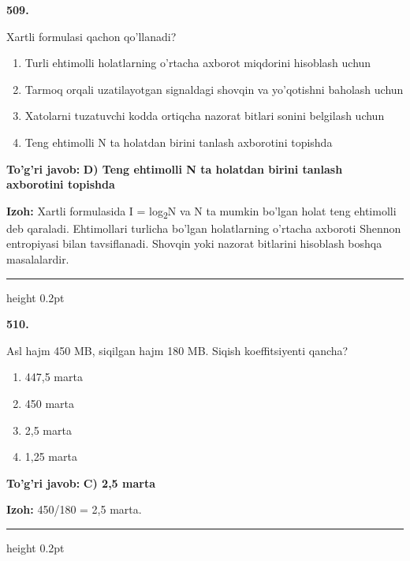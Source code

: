 \documentclass[10pt,a4paper,oneside]{article}
\begin{document}
\noindent\textbf{\color{ink}509.}
\par
Xartli formulasi qachon qo'llanadi?
\begin{enumerate}[label=\Alph*),leftmargin=9mm]
\item Turli ehtimolli holatlarning o'rtacha axborot miqdorini hisoblash uchun
\item Tarmoq orqali uzatilayotgan signaldagi shovqin va yo'qotishni baholash uchun
\item Xatolarni tuzatuvchi kodda ortiqcha nazorat bitlari sonini belgilash uchun
\item Teng ehtimolli N ta holatdan birini tanlash axborotini topishda
\end{enumerate}
\begin{tcolorbox}[enhanced,breakable,colback=teal!4,colframe=teal!50!black,boxrule=0.5pt,arc=1.1mm,left=3mm,right=3mm,top=1.7mm,bottom=1.7mm,before skip=2mm,after skip=2mm]
\textbf{\color{teal}To'g'ri javob:} \textbf{D) Teng ehtimolli N ta holatdan birini tanlash axborotini topishda}
\par\smallskip
\textbf{Izoh:} Xartli formulasida I = log\textsubscript{2}N va N ta mumkin bo'lgan holat teng ehtimolli deb qaraladi. Ehtimollari turlicha bo'lgan holatlarning o'rtacha axboroti Shennon entropiyasi bilan tavsiflanadi. Shovqin yoki nazorat bitlarini hisoblash boshqa masalalardir.
\end{tcolorbox}
\vspace{2mm}\hrule height 0.2pt \vspace{3mm}

\noindent\textbf{\color{ink}510.}
\par
Asl hajm 450 MB, siqilgan hajm 180 MB. Siqish koeffitsiyenti qancha?
\begin{enumerate}[label=\Alph*),leftmargin=9mm]
\item 447,5 marta
\item 450 marta
\item 2,5 marta
\item 1,25 marta
\end{enumerate}
\begin{tcolorbox}[enhanced,breakable,colback=teal!4,colframe=teal!50!black,boxrule=0.5pt,arc=1.1mm,left=3mm,right=3mm,top=1.7mm,bottom=1.7mm,before skip=2mm,after skip=2mm]
\textbf{\color{teal}To'g'ri javob:} \textbf{C) 2,5 marta}
\par\smallskip
\textbf{Izoh:} 450/180 = 2,5 marta.
\end{tcolorbox}
\vspace{2mm}\hrule height 0.2pt \vspace{3mm}
\end{document}
